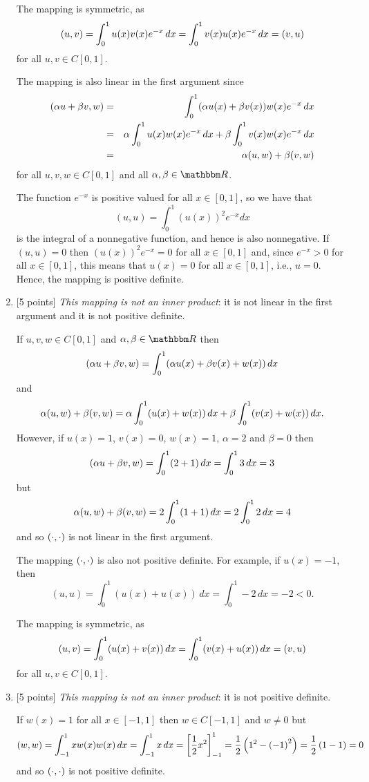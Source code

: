 \begin{solution}
\begin{enumerate}
The mapping is symmetric, as 
\[
(u,v) = \int_0^1 u(x) v(x) e^{-x}\, d x =  \int_0^1 v(x) u(x) e^{-x} \, d x = (v,u)
\]
for all $u,v\in C[0,1]$.

The mapping is also linear in the first argument since
\begin{eqnarray*}
(\alpha u + \beta v, w) &=& \int_0^1 (\alpha u(x) + \beta v(x)) w(x) e^{-x}\, d x
\\
&=&  \alpha \int_0^1 u(x)w(x) e^{-x}\, dx +  \beta \int_0^1 v(x)w(x) e^{-x}\, dx
\\
&=& \alpha (u,w) + \beta (v,w)
\end{eqnarray*}
for all $u,v,w\in C[0,1]$ and all $\alpha,\beta\in\R$.

The function $e^{-x}$ is positive valued for all $x\in[0,1]$, so we have that
\[
(u,u) = \int_0^1 (u(x))^2 e^{-x} d x
\]
is the integral of a nonnegative function, and hence is also nonnegative. If $(u,u) = 0$ then $(u(x))^2 e^{-x} = 0$ for all $x\in[0,1]$ and, since $e^{-x} > 0$ for all $x\in[0,1]$, this means that $u(x)=0$ for all $x\in[0,1]$, i.e., $u=0$. Hence, the mapping is positive definite.
\\
\item {[5 points]} \emph{This mapping is not an inner product}: it is not linear in the first argument and it is not positive definite.

If $u,v,w\in C[0,1]$ and $\alpha,\beta\in\R$ then
\[
(\alpha u + \beta v, w) = \int_0^1 (\alpha u(x)+\beta v(x) + w(x)) \,dx
\]
and
\[
\alpha(u, w)+\beta(v, w) = \alpha\int_0^1 (u(x) + w(x)) \,dx + \beta\int_0^1 (v(x) + w(x)) \,dx.
\]
However, if $u(x)=1$, $v(x)=0$, $w(x)=1$, $\alpha=2$ and $\beta=0$ then
\[
(\alpha u+\beta v,w) = \int_0^1 (2+1)\, d x = \int_0^1 3\, d x = 3
\]
but
\[
\alpha(u,w)+\beta(v,w) = 2\int_0^1 (1+1) \, d x = 2\int_0^1 2\, d x = 4
\]
and so $(\cdot,\cdot)$ is not linear in the first argument.

The mapping $(\cdot,\cdot)$ is also not positive definite. For example, if $u(x) = -1$,  then
\[
(u,u) = \int_0^1 (u(x)+ u(x)) \, dx = \int_0^1 -2\, dx = -2 < 0.
\]
      
The mapping is symmetric, as 
\[
(u,v) = \int_0^1 (u(x)+v(x)) \, d x =  \int_0^1 (v(x)+u(x))  \, d x = (v,u)
\]
for all $u,v\in C[0,1]$.
\\
\item {[5 points]} \emph{This mapping is not an inner product}: it is not positive definite.

If $w(x)=1$ for all $x\in[-1,1]$ then $w\in C[-1,1]$ and $w\ne 0$ but
\[
(w,w)=\int_{-1}^1xw(x)w(x)\,dx=\int_{-1}^1x\,dx=\left[{1\over 2}x^2\right]_{-1}^1={1\over 2}\left(1^2-\left(-1\right)^2\right)={1\over 2}\left(1-1\right)=0
\]
and so $(\cdot,\cdot)$ is not positive definite.


\end{enumerate}
\end{solution}
